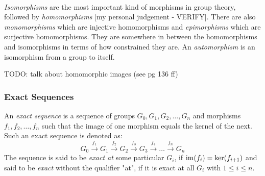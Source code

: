 \paragraph{}
\emph{Isomorphisms} are the most important kind of morphisms in group theory, followed by \emph{homomorphisms} [my personal judgement - VERIFY]. There are also \emph{monomorphisms} which are injective homomorphisms and \emph{epimorphisms} which are surjective homomorphisms. They are somewhere in between the homomorphisms and isomorphisms in terms of how constrained they are. An \emph{automorphism} is an isomorphism from a group to itself.


TODO: talk about homomorphic images (see \cite{ABoAA} pg 136 ff)




\subsubsection{Exact Sequences}
An \emph{exact sequence} is a sequence of groups $G_0, G_1, G_2, \ldots, G_n$ and morphisms $f_1, f_2, \ldots, f_n$ such that the image of one morphism equals the kernel of the next. Such an exact sequence is denoted as:
\begin{equation}
 G_0 \xrightarrow{f_1} G_1 
     \xrightarrow{f_2} G_2 
     \xrightarrow{f_3} G_3
     \xrightarrow{f_4} 
     \ldots
     \xrightarrow{f_n} G_n  
\end{equation}
The sequence is said to be \emph{exact at} some particular $G_i$, if $\operatorname{im}(f_i) = \ker(f_{i+1})$ and said to be \emph{exact} without the qualifier "at", if it is exact at all $G_i$ with $1 \leq i \leq n$.



















